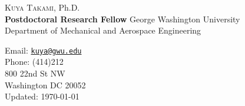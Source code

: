 \documentclass[11pt,letterpaper]{article}
\begin{document}
  \begin{minipage}{0.7\linewidth}
  {\vspace{1cm}\selectfont \Huge {\scshape Kuya Takami}, Ph.D.}\\
\vspace{5mm}
{\bf Postdoctoral Research Fellow} \quad George Washington University\\
Department of Mechanical and Aerospace Engineering\\

  \end{minipage}
  \hspace{2mm}
  \begin{minipage}{0.6\linewidth}
    \vspace{5mm}
  	Email:  \href{mailto:kuya@gwu.edu}{\tt kuya@gwu.edu} \\
    Phone:  (414)212\\

    800 22nd St NW\\
    Washington DC 20052\\
    \vspace{5pt}
    Updated: \today
  \end{minipage}
\end{document}
